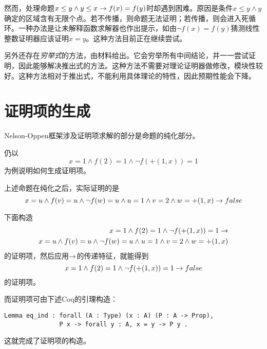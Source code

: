 然而，处理命题$x \leq y \land y \leq x \rightarrow f(x) = f(y)$时却遇到困难。原因是条件$x \leq y \land y$确定的区域含有无限个点。若不传播，则命题无法证明；若传播，则会进入死循环。一种办法是让未解释函数求解器也作出提示，如由$\lnot f(x) = f(y)$猜测线性整数证明器应该证明$x=y$。这种方法目前正在继续尝试。

另外还存在\emph{穷举式}的方法，由材料\cite{Harrison:2009:HPL:1540610}给出。它会穷举所有中间结论，并一一尝试证明，因此能够解决推出式的方法。这种方法不需要对理论证明器做修改，模块性较好。这种方法相对于推出式，不能利用具体理论的特性，因此预期性能会下降。

\section{证明项的生成}
Nelson-Oppen框架涉及证明项求解的部分是命题的纯化部分。

仍以
$$x = 1 \land f(2) = 1 \land \lnot f(+(1,x))=1$$
为例说明如何生成证明项。

上述命题在纯化之后，实际证明的是
$$x = u \land f(v) = u \land \lnot f(w)=u \land u = 1 \land v = 2 \land w = +(1, x) \rightarrow false$$

下面构造
\begin{align*}
x = 1 \land f(2) = 1 \land \lnot f(+(1,x))=1 \rightarrow \\
x = u \land f(v) = u \land \lnot f(w)=u \land u = 1 \land v = 2 \land w = +(1, x)
\end{align*}
的证明项，然后应用$\rightarrow$的传递特征，就能得到
$$x = 1 \land f(2) = 1 \land \lnot f(+(1,x))=1 \rightarrow false$$
的证明项。

而证明项可由下述Coq的引理构造：
\begin{verbatim}
Lemma eq_ind : forall (A : Type) (x : A) (P : A -> Prop),
               P x -> forall y : A, x = y -> P y .
\end{verbatim}

这就完成了证明项的构造。
